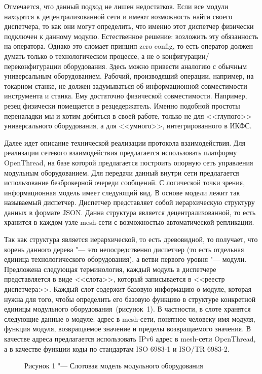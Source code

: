 Отмечается, что данный подход не лишен недостатков. Если все модули находятся к децентрализованной сети и имеют возможность найти своего диспетчера, то как они могут определить, что именно этот диспетчер физически подключен к данному модулю. Естественное решение: возложить эту обязанность на оператора. Однако это сломает принцип zero config, то есть оператор должен думать только о технологическом процессе, а не о конфигурации/переконфигурации оборудования. Здесь можно привести аналогию с обычным универсальным оборудованием. Рабочий, производящий операции, например, на токарном станке, не должен задумываться об информационной совместимости инструмента и станка. Ему достаточно физической совместимости. Например, резец физически помещается в резцедержатель. Именно подобной простоты переналадки мы и хотим добиться в своей работе, только не для <<глупого>> универсального оборудования, а для <<умного>>, интегрированного в ИКФС.

Далее идет описание технической реализации протокола взаимодействия. Для реализации сетевого взаимодействия предлагается использовать платформу OpenThread, на базе которой предлагается построить опорную сеть управления модульным оборудованием.  Для передачи данный внутри сети предлагается использование безброкерной очереди сообщений. С логической точки зрения, информационная модель имеет следующий вид. В основе модели лежит так называемый диспетчер. Диспетчер представляет собой иерархическую структуру данных в формате JSON. Данна структура является децентрализованной, то есть хранится в каждом узле mesh-сети с возможностью автоматической репликации.

Так как структура является иерархической, то есть древовидной, то получает, что корень данного дерева "--- это непосредственно диспетчер (то есть отдельная единица технологического оборудования), а ветви первого уровня "--- модули. Предложена следующая терминология, каждый модуль в диспетчере представляется в виде <<слота>>, который записывается в <<реестр диспетчера>>. Каждый слот содержит базовую информацию о модуле, которая нужна для того, чтобы определить его базовую функцию в структуре конкретной единицы модульного оборудования~(рисунок~1). В частности, в слоте хранятся следующие данные о модуле: адрес в mesh-сети, понятное человеку имя модуля, функция модуля, возвращаемое значение и пределы возвращаемого значения. В качестве адреса предлагается использовать IPv6 адрес в mesh-сети OpenThread, а в качестве функции коды по стандартам ISO 6983-1 и ISO/TR 6983-2.

\begin{figure}[ht]
	\caption*{Рисунок 1 "--- Слотовая модель модульного оборудования}\label{fig:main-arch}
\end{figure}

